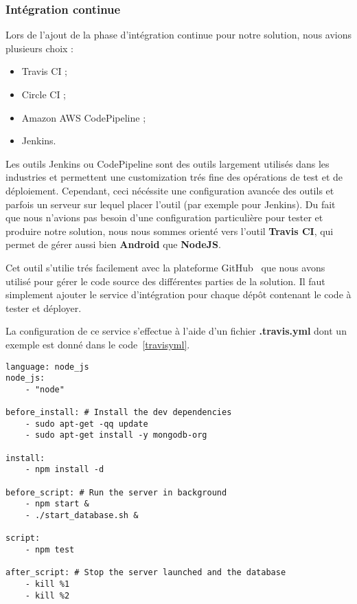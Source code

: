 \subsubsection{Intégration continue}

Lors de l'ajout de la phase d'intégration continue pour notre solution, nous avions plusieurs choix :
\begin{itemize}
    \item Travis CI ;
    \item Circle CI ;
    \item Amazon AWS CodePipeline ;
    \item Jenkins.
\end{itemize}

Les outils Jenkins ou CodePipeline sont des outils largement utilisés dans les industries et permettent une customization trés fine des opérations de test et de déploiement. Cependant, ceci nécéssite une configuration avancée des outils et parfois un serveur sur lequel placer l'outil (par exemple pour Jenkins). Du fait que nous n'avions pas besoin d'une configuration particulière pour tester et produire notre solution, nous nous sommes orienté vers l'outil \textbf{Travis CI}, qui permet de gérer aussi bien \textbf{Android} que \textbf{NodeJS}.

Cet outil s'utilie trés facilement avec la plateforme GitHub~\cite{github} que nous avons utilisé pour gérer le code source des différentes parties de la solution. Il faut simplement ajouter le service d'intégration pour chaque dépôt contenant le code à tester et déployer.

La configuration de ce service s'effectue à l'aide d'un fichier \textbf{.travis.yml} dont un exemple est donné dans le code~\ref{travisyml}.

\lstset{language=sh}
\begin{lstlisting}[caption=Exemple de fichier de configuration Travis (service web), label=travisyml]
language: node_js
node_js:
    - "node"

before_install: # Install the dev dependencies
    - sudo apt-get -qq update
    - sudo apt-get install -y mongodb-org

install:
    - npm install -d

before_script: # Run the server in background
    - npm start &
    - ./start_database.sh &

script:
    - npm test

after_script: # Stop the server launched and the database
    - kill %1
    - kill %2
\end{lstlisting}

